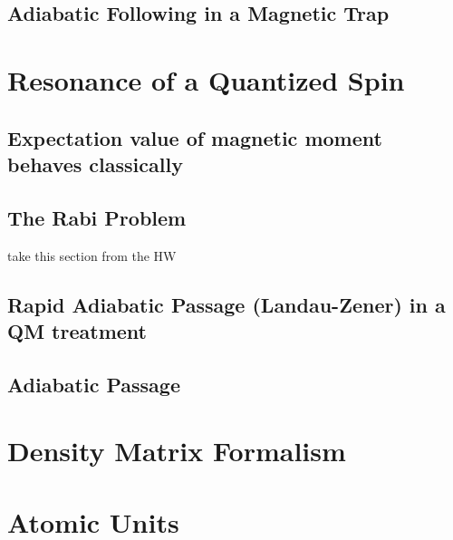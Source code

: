 \documentclass{book}
\theoremstyle{definition}
\begin{document}
\subsection{Adiabatic Following in a Magnetic Trap}





\section{Resonance of a Quantized Spin}




\subsection{Expectation value of magnetic moment behaves classically}


\subsection{The Rabi Problem}

take this section from the HW


\subsection{Rapid Adiabatic Passage (Landau-Zener) in a QM treatment}


\subsection{Adiabatic Passage}



\section{Density Matrix Formalism}











\section{Atomic Units}





\end{document}

